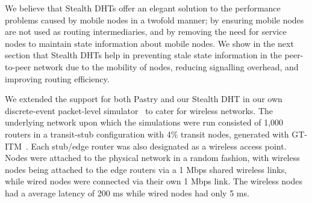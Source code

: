 \documentclass[times, 10pt,twocolumn]{article}
\begin{document}


We believe that Stealth DHTs offer an elegant solution to the
performance problems caused by mobile nodes in a twofold manner; by
ensuring mobile nodes are not used as routing intermediaries, and by
removing the need for service nodes to maintain state information
about mobile nodes. We show in the next section that Stealth DHTs
help in preventing stale state information in the peer-to-peer
network due to the mobility of nodes, reducing signalling overhead,
and improving routing efficiency.

 \label{sect-eval}

We extended the support for both Pastry and our Stealth DHT in our
own discrete-event packet-level simulator~\cite{stealth1} to cater
for wireless networks. The underlying network upon which the
simulations were run consisted of 1,000 routers in a transit-stub
configuration with 4\% transit nodes, generated with
GT-ITM~\cite{gtitm}. Each stub/edge router was also designated as a
wireless access point. Nodes were attached to the physical network
in a random fashion, with wireless nodes being attached to the edge
routers via a 1 Mbps shared wireless links, while wired nodes were
connected via their own 1 Mbps link. The wireless nodes had a
average latency of 200 ms while wired nodes had only 5 ms.
\end{document}
